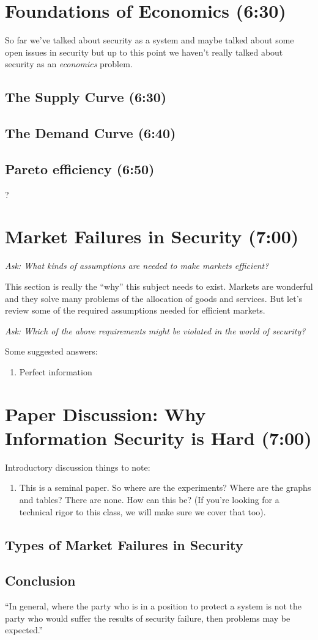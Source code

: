 \documentclass[11pt]{article}
\begin{document}
\section{Foundations of Economics (6:30)}

So far we've talked about security as a system and maybe talked about some open issues in security but up to this point we haven't really talked about security as an {\it economics} problem.

\subsection{The Supply Curve (6:30)}

\subsection{The Demand Curve (6:40)}

\subsection{Pareto efficiency (6:50)}?

\section{Market Failures in Security (7:00)}

{\it Ask: What kinds of assumptions are needed to make markets efficient?}


This section is really the ``why'' this subject needs to exist. 
Markets are wonderful and they solve many problems of the allocation of goods and services.
But let's review some of the required assumptions needed for efficient markets.

{\it Ask: Which of the above requirements might be violated in the world of security?}

Some suggested answers:
\begin{enumerate}
    \item Perfect information
\end{enumerate}

\section{Paper Discussion: Why Information Security is Hard (7:00)}

Introductory discussion things to note:
\begin{enumerate}
    \item This is a seminal paper. So where are the experiments? Where are the graphs and tables? There are none. How can this be? (If you're looking for a technical rigor to this class, we will make sure we cover that too).
\end{enumerate}

\subsection{Types of Market Failures in Security}

\subsection{Conclusion}

“In general, where the party who is in a position to protect a system is not the party who would suffer the results of security failure, then problems may be expected.”
\end{document}
